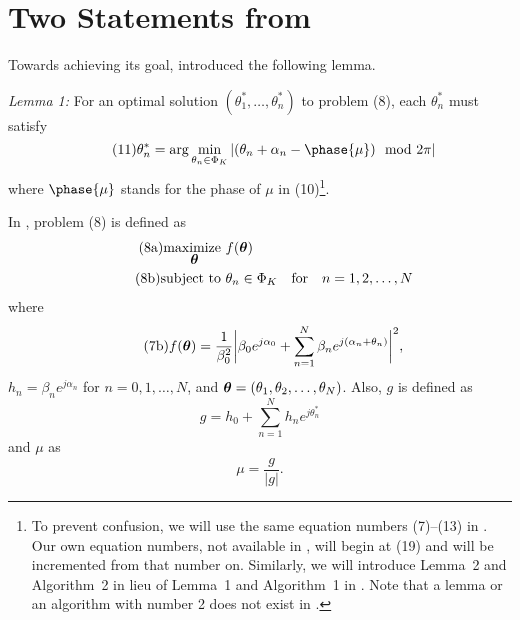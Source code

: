 %
\section{Two Statements from \cite{b1}}
%
Towards achieving its goal, \cite{b1} introduced the following lemma.

{\em Lemma 1:\/} For an optimal solution $(\theta_1^*, \ldots, \theta_n^*)$ to problem (8),
each $\theta_n^*$ must satisfy
\begin{equation}\tag{11}
\theta_n^* = \arg \min_{\theta_n\in \Phi_K} |(\theta_n +\alpha_n - \phase{\mu}) \mod 2\pi|
\end{equation}
where $\phase{\mu}$ stands for the phase of $\mu$ in (10)\footnote{To prevent confusion,
we will use the same equation numbers (7)--(13) in \cite{b1}. Our own equation numbers,
not available in \cite{b1}, will begin at (19) and will be incremented from that number
on. Similarly, we will introduce Lemma~2 and Algorithm~2 in lieu of Lemma~1 and Algorithm~1
in \cite{b1}. Note that a lemma or an algorithm with
number 2 does not exist in \cite{b1}.}.

In \cite{b1}, problem (8) is defined as
\begin{align}
\tag{8a}\underset{\mbox{\boldmath$\theta$}}{\rm maximize\ } & f({\mbox{\boldmath$\theta$}})\\
\tag{8b}{\rm subject\ to\ } & \theta_n\in \Phi_K\quad {\rm for}\quad n=1, 2, \ldots, N
\end{align}
where
\begin{equation*}\tag{7b}
f({\mbox{\boldmath$\theta$}}) = \frac{1}{\beta_0^2}\bigg|\beta_0e^{j\alpha_0}+\sum_{n=1}^N \beta_n
e^{j(\alpha_n + \theta_n)}\bigg|^2,
\end{equation*}
$h_n = \beta_ne^{j\alpha_n}$ for $n = 0, 1, \ldots, N$,
and ${\mbox{\boldmath$\theta$}} = (\theta_1, \theta_2, \ldots, \theta_N)$. Also, $g$ is defined as
\begin{equation}\tag{9}
g = h_0 + \sum_{n=1}^N h_n e^{j\theta_n^*}
\end{equation} and $\mu$ as
\begin{equation}\tag{10}
\mu = \frac{g}{|g|}.
\end{equation}

